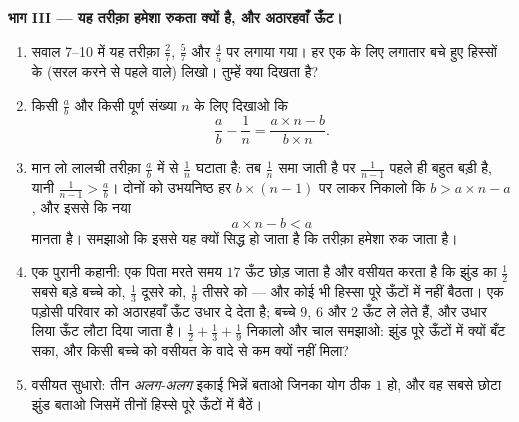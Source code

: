 \begin{problem}
\medskip
\noindent\textbf{भाग III --- यह तरीक़ा हमेशा रुकता क्यों है, और
अठारहवाँ ऊँट।}
\begin{enumerate}[resume]
  \item सवाल 7--10 में यह तरीक़ा $\frac27$, $\frac57$ और $\frac45$
        पर लगाया गया। हर एक के लिए लगातार बचे हुए हिस्सों के 
        (सरल करने से पहले वाले) लिखो। तुम्हें क्या दिखता है?
  \item किसी  $\frac ab$ और किसी पूर्ण संख्या $n$ के लिए
        दिखाओ कि
        \[
        \frac{a}{b} - \frac{1}{n}
        = \frac{a \times n - b}{b \times n} .
        \]
  \item मान लो लालची तरीक़ा $\frac ab$ में से $\frac1n$ घटाता है:
        तब $\frac1n$ समा जाती है पर $\frac{1}{n-1}$ पहले ही बहुत
        बड़ी है, यानी $\frac{1}{n-1} > \frac ab$। दोनों को
        उभयनिष्ठ हर $b \times (n - 1)$ पर लाकर निकालो कि
        $b > a \times n - a$, और इससे कि नया 
        \[
        a \times n - b < a
        \]
        मानता है। समझाओ कि इससे यह क्यों सिद्ध हो जाता है कि तरीक़ा
        हमेशा रुक जाता है।
  \item एक पुरानी कहानी: एक पिता मरते समय $17$ ऊँट छोड़ जाता है और
        वसीयत करता है कि झुंड का $\frac12$ सबसे बड़े बच्चे को,
        $\frac13$ दूसरे को, $\frac19$ तीसरे को --- और कोई भी हिस्सा
        पूरे ऊँटों में नहीं बैठता। एक पड़ोसी परिवार को अठारहवाँ ऊँट
        उधार दे देता है; बच्चे $9$, $6$ और $2$ ऊँट ले लेते हैं, और
        उधार लिया ऊँट लौटा दिया जाता है।
        $\frac12 + \frac13 + \frac19$ निकालो और चाल समझाओ: झुंड पूरे
        ऊँटों में क्यों बँट सका, और किसी बच्चे को वसीयत के वादे से
        कम क्यों नहीं मिला?
  \item वसीयत सुधारो: तीन \emph{अलग-अलग} इकाई भिन्नें बताओ जिनका
        योग ठीक $1$ हो, और वह सबसे छोटा झुंड बताओ जिसमें तीनों
        हिस्से पूरे ऊँटों में बैठें।
\end{enumerate}
\end{problem}
